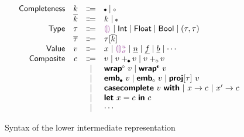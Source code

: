 \documentclass[index.tex]{subfiles}
\begin{document}
\begin{figure}
  \[\begin{array}{rccl}
    \SortNComplete & \SortNCompleteVar & \Coloneqq & \CNC \mid \CNI \\
    \SortComplete  & \SortCompleteVar  & \Coloneqq & \SortNCompleteVar \mid \CII \\
    \SortTypCon    & \SortTypConVar    & \Coloneqq & \TCHole \mid \TCInt \mid \TCFloat \mid \TCBool 
                                                   \mid \TCPair{\SortTypConVar}{\SortTypConVar} \\
    \SortTyp       & \SortTypVar       & \Coloneqq & \SortTypConVar[\SortCompleteVar] \\
    \SortValue     & \SortValueVar       & \Coloneqq & x \mid \EEHole{\SortHoleId}{\sigma}
                                                   \mid \EIntLit \mid \EFloatLit \mid \EBoolLit \mid \cdots \\
    \SortComp      & \SortCompVar      & \Coloneqq & \SortValueVar 
                                                   \mid \EPlusNC{\SortValueVar}{\SortValueVar} 
                                                   \mid \EPlusNI{\SortValueVar}{\SortValueVar} \\
                   &                   & \mid         & \EWrapIntoNI{\SortValueVar}
                                                   \mid \EWrapIntoII{\SortValueVar} \\
                   &                   & \mid         & \EEmbedNC{\SortValueVar}
                                                   \mid \EEmbedNI{\SortValueVar}
                                                   \mid \EProj{\SortValueVar}{\SortTypConVar} \\
                   &                   & \mid         & \ECaseCompleteWith{\SortValueVar}
                                                     \ECaseCompleteBranch{x}{\SortCompVar}
                                                    ~\ECaseCompleteBranch{x'}{\SortCompVar} \\
                   &                   & \mid         & \ELet{x}{\SortCompVar} \EInn{\SortCompVar} \\
                   &                   & \mid         & \cdots
  \end{array}\]
  \caption{Syntax of the lower intermediate representation}
  \label{lower-ir-syntax}
\end{figure}
   
\end{document}
